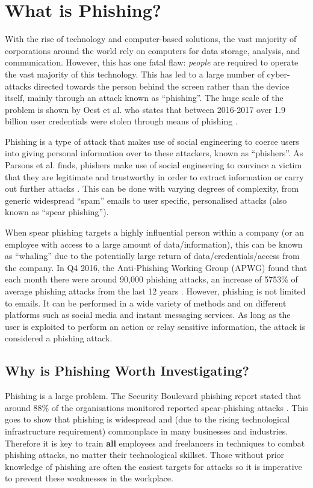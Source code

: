 \documentclass{l4proj}
\begin{document}
\section{What is Phishing?}
With the rise of technology and computer-based solutions, the vast majority of corporations around the world rely on computers for data storage, analysis, and communication. However, this has one fatal flaw: \textit{people} are required to operate the vast majority of this technology. This has led to a large number of cyber-attacks directed towards the person behind the screen rather than the device itself, mainly through an attack known as “phishing”. The huge scale of the problem is shown by Oest et al. who states that between 2016-2017 over 1.9 billion user credentials were stolen through means of phishing \citep{oest2018inside}.

Phishing is a type of attack that makes use of social engineering to coerce users into giving personal information over to these attackers, known as “phishers”. As Parsons et al. finds, phishers make use of social engineering to convince a victim that they are legitimate and trustworthy in order to extract information or carry out further attacks \citep{parsons2019predicting}. This can be done with varying degrees of complexity, from generic widespread “spam” emails to user specific, personalised attacks (also known as “spear phishing”). 

When spear phishing targets a highly influential person within a company (or an employee with access to a large amount of data/information), this can be known as “whaling” due to the potentially large return of data/credentials/access from the company. In Q4 2016, the Anti-Phishing Working Group (APWG) found that each month there were around 90,000 phishing attacks, an increase of 5753\% of average phishing attacks from the last 12 years \citep{apwg2017phishing}. However, phishing is not limited to emails. It can be performed in a wide variety of methods and on different platforms such as social media and instant messaging services. As long as the user is exploited to perform an action or relay sensitive information, the attack is considered a phishing attack.

\subsection{Why is Phishing Worth Investigating?}
Phishing is a large problem. The Security Boulevard phishing report stated that around 88\% of the organisations monitored reported spear-phishing attacks \citep{bhardwaj2020phishing}. This goes to show that phishing is widespread and (due to the rising technological infrastructure requirement) commonplace in many businesses and industries. Therefore it is key to train \textbf{all} employees and freelancers in techniques to combat phishing attacks, no matter their technological skillset. Those without prior knowledge of phishing are often the easiest targets for attacks so it is imperative to prevent these weaknesses in the workplace.
\end{document}
